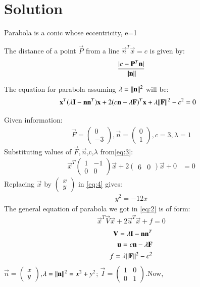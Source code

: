 \documentclass[journal,12pt,twocolumn]{IEEEtran}
\newcommand{\myvec}[1]{\ensuremath{\begin{pmatrix}#1\end{pmatrix}}}
\begin{document}
\section{Solution}
\begin{enumerate}
\begin{lemma}
\label{lemma}
Parabola is a conic whose eccentricity, e=1
\end{lemma}
\begin{lemma}
\label{lemma}
The distance of a point $\vec{P}$ from a line $\vec{n}^T\vec{x}=c$ is given by:
\begin{align}
\frac{\vert c-\mathbf{P}^T\mathbf{n}\vert}{\Vert\mathbf{n}\rVert}   
\end{align}
\end{lemma}
\begin{lemma}
The equation for parabola assuming $\lambda=\Vert\mathbf{n}\rVert^2$ will be: 
\begin{align}
\mathbf{x}^T(\lambda\mathbf{I}-\mathbf{n}\mathbf{n}^T)\mathbf{x}+2(c\mathbf{n}-\lambda\mathbf{F})^T\mathbf{x}+\lambda\Vert\mathbf{F}\rVert^2-c^2&=0\label{eq:2}
\end{align}
\end{lemma}
Given information:
\begin{align}
\vec{F}=\myvec{0\\-3},
\vec{n}=\myvec{0\\1},
c=3,
\lambda=1\label{eq:3}
\end{align}
Substituting values of $\vec{F},\vec{n}$,c,$\lambda$ from\eqref{eq:3}:
\begin{align}
\vec{x}^T\myvec{1&-1\\0&0}\vec{x}+2\myvec{6&0}\vec{x}+0&=0\label{eq:4}
\end{align}
Replacing $\vec{x}$ by $\myvec{x\\y}$ in \eqref{eq:4} gives:
\begin{align}
y^2=-12x
\end{align}
The general equation of parabola we got in \eqref{eq:2} is of form:
\begin{align}
\vec{x}^T\vec{V}\vec{x}+2\vec{u}^T\vec{x}+f=0
\end{align}
\begin{align}
\mathbf{V}=\lambda\mathbf{I}-\mathbf{n}\mathbf{n}^T\\
\mathbf{u}=c\mathbf{n}-\lambda\mathbf{F}\\
f=\lambda\Vert\mathbf{F}\rVert^2-c^2
\end{align}
$\vec{n}=\myvec{x\\y}$,$\lambda=\Vert\mathbf{n}\rVert^2=x^2+y^2$; $\vec{I}=\myvec{1&0\\0&1}$.Now,

\end{enumerate}
\end{document}
